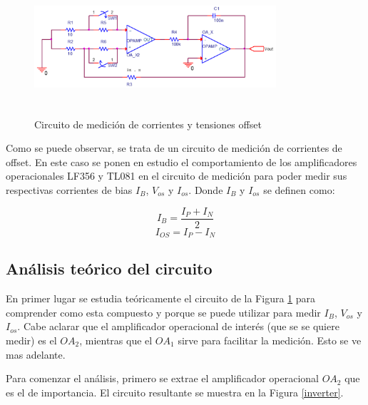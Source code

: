 \documentclass[12pt,a4paper]{article}
\begin{document}
\begin{figure}[ht]                                                       
    \centering\includegraphics[width=0.8\textwidth, height=5cm]{Figuras/circuito_medicion.png}
     \caption{Circuito de medición de corrientes y tensiones offset}
     \label{circuito_medicion}
     \end{figure}

     
Como se puede observar, se trata de un circuito de medición de corrientes de offset. En este caso se ponen en estudio el comportamiento de los
amplificadores operacionales LF356 y TL081 en el circuito de medición para poder medir sus respectivas corrientes de bias $I_B$, $V_{os}$ y $I_{os}$. Donde $I_B$ y $I_{os}$ se definen como:

\begin{equation} I_{B} = \frac{I_P+I_N}{2} \label{corriente_bias}\end{equation}
\begin{equation} I_{OS} = I_P - I_N \label{corriente_offset}\end{equation}

\subsection{Análisis teórico del circuito}


En primer lugar se estudia teóricamente el circuito de la Figura \ref{circuito_medicion} para comprender como esta compuesto y porque se puede utilizar para medir $I_B$, 
$V_{os}$  y $I_{os}$. Cabe aclarar que el amplificador operacional de interés (que se se quiere medir) es el $OA_2$, mientras que el $OA_1$ sirve para facilitar la medición. Esto se ve mas adelante.   

Para comenzar el análisis, primero se extrae el amplificador operacional $OA_2$ que es el de importancia. El circuito resultante se muestra en la Figura \ref{inverter}.
\end{document}
